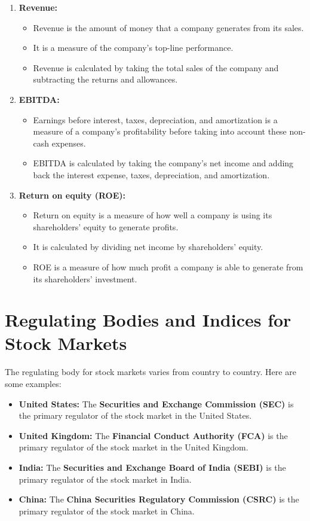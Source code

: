 \begin{enumerate}
    \item  \textbf{Revenue:}
    \begin{itemize}

        \item  Revenue is the amount of money that a company generates from its sales.
        \item  It is a measure of the company's top-line performance.
        \item  Revenue is calculated by taking the total sales of the company and subtracting the returns and allowances.
    \end{itemize}
    \item  \textbf{EBITDA:}
    \begin{itemize}
        \item  Earnings before interest, taxes, depreciation, and amortization is a measure of a company's profitability before taking into account these non-cash expenses.
        \item  EBITDA is calculated by taking the company's net income and adding back the interest expense, taxes, depreciation, and amortization.
    \end{itemize}
    \item  \textbf{Return on equity (ROE):}
    \begin{itemize}
        \item  Return on equity is a measure of how well a company is using its shareholders' equity to generate profits.
        \item  It is calculated by dividing net income by shareholders' equity.
        \item  ROE is a measure of how much profit a company is able to generate from its shareholders' investment.
    \end{itemize}
\end{enumerate}

\section{Regulating Bodies and Indices for Stock Markets}

The regulating body for stock markets varies from country to country. Here are some examples:

\begin{itemize}
\item \textbf{United States:} The \textbf{Securities and Exchange Commission (SEC)} is the primary regulator of the stock market in the United States.
\item \textbf{United Kingdom:} The \textbf{Financial Conduct Authority (FCA)} is the primary regulator of the stock market in the United Kingdom.
\item \textbf{India:} The \textbf{Securities and Exchange Board of India (SEBI)} is the primary regulator of the stock market in India.
\item \textbf{China:} The \textbf{China Securities Regulatory Commission (CSRC)} is the primary regulator of the stock market in China.
\end{itemize}

